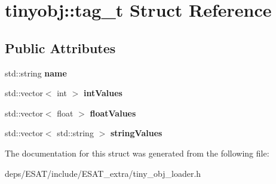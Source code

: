 \hypertarget{structtinyobj_1_1tag__t}{}\section{tinyobj\+:\+:tag\+\_\+t Struct Reference}
\label{structtinyobj_1_1tag__t}
\subsection*{Public Attributes}
\begin{DoxyCompactItemize}
\item 
\mbox{\label{structtinyobj_1_1tag__t_a9b3650154d2fbd83dad945ebcf6bd448}} 
std\+::string {\bfseries name}
\item 
\mbox{\label{structtinyobj_1_1tag__t_adc6a6682263abaa11e3ec62b910bb80d}} 
std\+::vector$<$ int $>$ {\bfseries int\+Values}
\item 
\mbox{\label{structtinyobj_1_1tag__t_a0e171be79978f9ef6de6abb33d1d4dc5}} 
std\+::vector$<$ float $>$ {\bfseries float\+Values}
\item 
\mbox{\label{structtinyobj_1_1tag__t_a25634eea923961fd5b2520ea782397e8}} 
std\+::vector$<$ std\+::string $>$ {\bfseries string\+Values}
\end{DoxyCompactItemize}


The documentation for this struct was generated from the following file\+:\begin{DoxyCompactItemize}
\item 
deps/\+E\+S\+A\+T/include/\+E\+S\+A\+T\+\_\+extra/tiny\+\_\+obj\+\_\+loader.\+h\end{DoxyCompactItemize}
